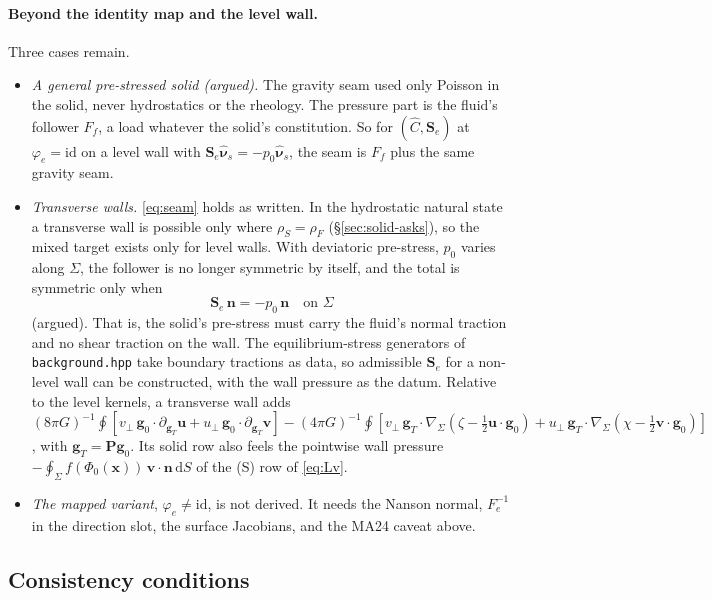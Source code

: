 \documentclass[11pt]{article}
\theoremstyle{definition}
\theoremstyle{remark}
\newcommand{\bu}{\mathbf{u}}
\newcommand{\bv}{\mathbf{v}}
\newcommand{\bn}{\mathbf{n}}
\newcommand{\bx}{\mathbf{x}}
\newcommand{\dS}{\,\mathrm{d}S}
\newcommand{\code}[1]{\texttt{#1}}
\newcommand{\nuhs}{\hat{\boldsymbol{\nu}}_s}
\newcommand{\Se}{\mathbf{S}_e}
\begin{document}
\paragraph{Beyond the identity map and the level wall.} Three cases
remain.
\begin{itemize}
\item \emph{A general pre-stressed solid (argued).} The gravity seam
  used only Poisson in the solid, never hydrostatics or the rheology.
  The pressure part is the fluid's follower $F_f$, a load whatever the
  solid's constitution. So for $(\hat C, \Se)$ at $\varphi_e =
  \mathrm{id}$ on a level wall with $\Se\nuhs = -p_0\nuhs$, the
  seam is $F_f$ plus the same gravity seam.
\item \emph{Transverse walls.} \eqref{eq:seam} holds as written. In the
  hydrostatic natural state a transverse wall is possible only where
  $\rho_S = \rho_F$ (\S\ref{sec:solid-asks}), so the mixed target
  exists only for level walls. With deviatoric pre-stress, $p_0$
  varies along $\Sigma$, the follower is no longer symmetric by itself,
  and the total is symmetric only when
  \begin{equation}
    \Se\,\bn = -p_0\,\bn \quad\text{on } \Sigma
    \label{eq:traction}
  \end{equation}
  (argued). That is, the solid's pre-stress must carry the fluid's
  normal traction and no shear traction on the wall. The
  equilibrium-stress generators of \code{background.hpp} take boundary
  tractions as data, so admissible $\Se$ for a non-level wall can be
  constructed, with the wall pressure as the datum. Relative to the
  level kernels, a transverse wall adds $(8\pi G)^{-1}\oint[v_\perp\,
  \mathbf g_0\cdot\partial_{\mathbf g_T}\bu + u_\perp\,\mathbf g_0\cdot
  \partial_{\mathbf g_T}\bv] - (4\pi G)^{-1}\oint[v_\perp\,\mathbf g_T\cdot
  \nabla_\Sigma(\zeta - \tfrac12\bu\cdot\mathbf g_0) + u_\perp\,\mathbf
  g_T\cdot\nabla_\Sigma(\chi - \tfrac12\bv\cdot\mathbf g_0)]$, with
  $\mathbf g_T = \mathbf P\mathbf g_0$. Its solid row also feels the
  pointwise wall pressure $-\oint_\Sigma f(\Phi_0(\bx))\,\bv\cdot\bn\dS$
  of the (S) row of \eqref{eq:Lv}.
\item \emph{The mapped variant}, $\varphi_e \ne \mathrm{id}$, is not
  derived. It needs the Nanson normal, $F_e^{-1}$ in the direction
  slot, the surface Jacobians, and the MA24 caveat above.
\end{itemize}

\subsection{Consistency conditions}
\label{sec:solid-consistency}
\end{document}
